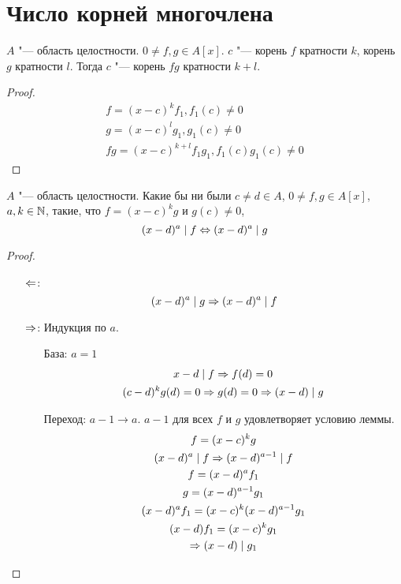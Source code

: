﻿\section{Число корней многочлена}
\begin{lemma}
$A$ "--- область целостности. $0 \ne f, g \in A[x]$. $c$ "--- корень $f$ кратности $k$, корень $g$ кратности $l$.
Тогда $c$ "--- корень $fg$ кратности $k + l$.
\end{lemma}
\begin{proof}
\begin{gather*}
f = (x - c)^kf_1, f_1(c) \ne 0 \\
g = (x - c)^lg_1, g_1(c) \ne 0 \\
fg = (x - c)^{k + l}f_1g_1, f_1(c)g_1(c) \ne 0
\end{gather*}
\end{proof}

\begin{lemma}
$A$ "--- область целостности.
Какие бы ни были $c \ne d \in A$, $0 \ne f, g \in A[x]$, $a, k \in \mathbb{N}$, такие, что $f = (x - c)^{k}g$ и $g(c) \ne 0$,
\[ (x - d)^{a} \mid f \Leftrightarrow (x - d)^{a} \mid g \]
\end{lemma}

\begin{proof}
\begin{itemize}
\item[$\Leftarrow$:]
\[ (x - d)^{a} \mid g \Rightarrow (x - d)^{a} \mid f \]
\item[$\Rightarrow$:]
Индукция по $a$.
\begin{itemize}
\item[База:] $a= 1$
\begin{gather*}
x - d \mid f \Rightarrow f(d) = 0 \\
(c - d)^k g(d) = 0 \Rightarrow g(d) = 0 \Rightarrow (x - d) \mid g
\end{gather*}
\item[Переход:] $a - 1 \to a$. 
$a - 1$ для всех $f$ и $g$ удовлетворяет условию леммы.
\begin{gather*}
f = (x - c)^{k}g \\
(x - d)^{a} \mid f \Rightarrow (x - d)^{a - 1} \mid f \\
f = (x - d)^{a}f_1 \\
g = (x - d)^{a - 1}g_1 \\
(x - d)^af_1 = (x - c)^{k}(x - d)^{a - 1}g_1 \\
(x - d)f_1 = (x - c)^kg_1 \\
\Rightarrow (x - d) \mid g_1
\end{gather*}
\end{itemize}
\end{itemize}
\end{proof}

